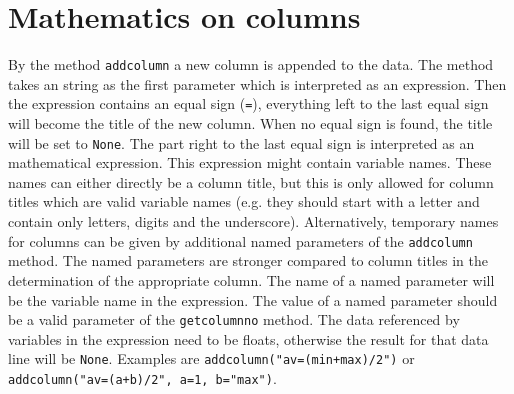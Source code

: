 \section{Mathematics on columns}

By the method \verb|addcolumn| a new column is appended to the data.
The method takes an string as the first parameter which is interpreted
as an expression. Then the expression contains an equal sign
(\verb|=|), everything left to the last equal sign will become the
title of the new column. When no equal sign is found, the title will
be set to \verb|None|. The part right to the last equal sign is
interpreted as an mathematical expression. This expression might
contain variable names. These names can either directly be a column
title, but this is only allowed for column titles which are valid
variable names (e.g. they should start with a letter and contain only
letters, digits and the underscore). Alternatively, temporary names
for columns can be given by additional named parameters of the
\verb|addcolumn| method. The named parameters are stronger compared to
column titles in the determination of the appropriate column. The name
of a named parameter will be the variable name in the expression. The
value of a named parameter should be a valid parameter of the
\verb|getcolumnno| method. The data referenced by variables in the
expression need to be floats, otherwise the result for that data line
will be \verb|None|. Examples are \verb|addcolumn("av=(min+max)/2")|
or \verb|addcolumn("av=(a+b)/2", a=1, b="max")|.

